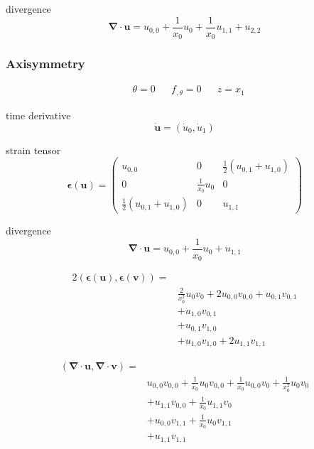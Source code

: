 \documentclass{scrartcl}
\newcommand{\vect}[1]{\boldsymbol{#1}}
\newcommand{\ten}[1]{\boldsymbol{#1}}
\begin{document}
divergence
\[
\vect{\nabla} \cdot \vect{u} = u_{0,0} + \frac{1}{x_0}u_0 + \frac{1}{x_0}u_{1,1}
+ u_{2,2}
\]

\subsubsection{Axisymmetry}

\begin{align*}
&\theta = 0 & &f_{,\theta} = 0 & & z = x_1
\end{align*}

time derivative
\[
\dot{\vect{u}} = ( \dot{u}_0, \dot{u}_1 )
\]

strain tensor
\[
\ten{\epsilon}(\vect{u}) = 
\begin{pmatrix}
u_{0,0} & 0 & \frac{1}{2}(u_{0,1} + u_{1,0}) \\
0 & \frac{1}{x_0}u_0 & 0 \\
\frac{1}{2}(u_{0,1} + u_{1,0}) & 0 & u_{1,1} 
\end{pmatrix}
\]

divergence
\[
\vect{\nabla} \cdot \vect{u} = u_{0,0} + \frac{1}{x_0}u_0 + u_{1,1}
\]

\begin{align*}
2(\ten{\epsilon}(\vect{u}), \ten{\epsilon}(\vect{v})) =& \\
&\frac{2}{x_0^2}u_0 v_0 + 2 u_{0,0} v_{0,0} + u_{0,1} v_{0,1} \\
&+ u_{1,0} v_{0,1} \\
&+ u_{0,1} v_{1,0} \\
&+ u_{1,0} v_{1,0} + 2 u_{1,1} v_{1,1}
\end{align*}

\begin{align*}
(\vect{\nabla} \cdot \vect{u}, \vect{\nabla} \cdot \vect{v}) =& \\
& u_{0,0} v_{0,0} + \frac{1}{x_0} u_0 v_{0,0} 
+ \frac{1}{x_0} u_{0,0} v_0 + \frac{1}{x_0^2} u_0 v_0 \\
&+ u_{1,1} v_{0,0} + \frac{1}{x_0} u_{1,1} v_0 \\
&+ u_{0,0} v_{1,1} + \frac{1}{x_0} u_0 v_{1,1} \\
&+ u_{1,1} v_{1,1}
\end{align*}
\end{document}
